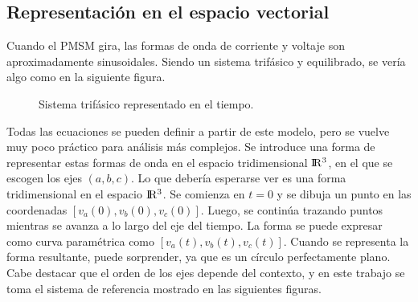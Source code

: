 \subsection{Representación en el espacio vectorial}

Cuando el PMSM gira, las formas de onda de corriente y voltaje son aproximadamente sinusoidales. Siendo un sistema trifásico y equilibrado, se vería algo como en la siguiente figura.

\begin{figure}[H]
    \centering
    \hspace*{-1.5cm}
    \caption{Sistema trifásico representado en el tiempo.}
\end{figure}

Todas las ecuaciones se pueden definir a partir de este modelo, pero se vuelve muy poco práctico para análisis más complejos. Se introduce una forma de representar estas formas de onda en el espacio tridimensional ${\rm I\!R^3}$, en el que se escogen los ejes \((a, b, c)\). Lo que debería esperarse ver es una forma tridimensional en el espacio ${\rm I\!R^3}$. Se comienza en \(t = 0\) y se dibuja un punto en las coordenadas \([v_a(0), v_b(0), v_c(0)]\). Luego, se continúa trazando puntos mientras se avanza a lo largo del eje del tiempo. La forma se puede expresar como curva paramétrica como \([v_a(t), v_b(t), v_c(t)]\). Cuando se representa la forma resultante, puede sorprender, ya que es un círculo perfectamente plano. Cabe destacar que el orden de los ejes depende del contexto, y en este trabajo se toma el sistema de referencia mostrado en las siguientes figuras.


